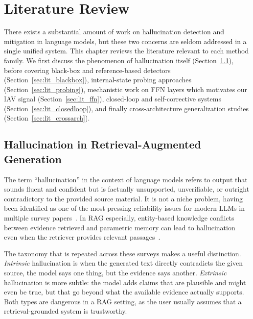\chapter{Literature Review}
\label{ch:literature_review}

There exists a substantial amount of work on hallucination detection and mitigation in language models, but these two concerns are seldom addressed in a single unified system. This chapter reviews the literature relevant to each method family. We first discuss the phenomenon of hallucination itself (Section~\ref{sec:lit_hallucination}), before covering black-box and reference-based detectors (Section~\ref{sec:lit_blackbox}), internal-state probing approaches (Section~\ref{sec:lit_probing}), mechanistic work on FFN layers which motivates our IAV signal (Section~\ref{sec:lit_ffn}), closed-loop and self-corrective systems (Section~\ref{sec:lit_closedloop}), and finally cross-architecture generalization studies (Section~\ref{sec:lit_crossarch}).

\section{Hallucination in Retrieval-Augmented Generation}
\label{sec:lit_hallucination}

The term ``hallucination'' in the context of language models refers to output that sounds fluent and confident but is factually unsupported, unverifiable, or outright contradictory to the provided source material. It is not a niche problem, having been identified as one of the most pressing reliability issues for modern LLMs in multiple survey papers~\cite{ji2023hallucination,huang2023survey,rawte2023survey}. In RAG especially, entity-based knowledge conflicts between evidence retrieved and parametric memory can lead to hallucination even when the retriever provides relevant passages~\cite{longpre2021entity}.

The taxonomy that is repeated across these surveys makes a useful distinction. \emph{Intrinsic} hallucination is when the generated text directly contradicts the given source, the model says one thing, but the evidence says another. \emph{Extrinsic} hallucination is more subtle: the model adds claims that are plausible and might even be true, but that go beyond what the available evidence actually supports. Both types are dangerous in a RAG setting, as the user usually assumes that a retrieval-grounded system is trustworthy.

